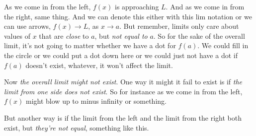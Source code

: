 \documentclass[pdftex, brazil, 12pt, twoside]{article}
\begin{document}
As we come in from the left, $f(x)$ is approaching $L$.
And as we come in from the right, same thing.
And we can denote this either with this lim notation
or we can use arrows, $f(x) \to L$, as $x \to a$.
But remember, limits only care about values
of $x$ that are \emph{close} to $a$, but \emph{not equal to} $a$.
So for the sake of the overall limit,
it's not going to matter whether we have a dot for $f(a)$.
We could fill in the circle or we could put a dot down here
or we could just not have a dot if $f(a)$ doesn't exist,
whatever, it won't affect the limit.

Now \emph{the overall limit might not exist}.
One way it might it fail to exist
is if \emph{the limit from one side does not exist}.
So for instance as we come in from the left, $f(x)$
might blow up to minus infinity or something.

\begin{figure}[H]
  \begin{center}
  \end{center}
\end{figure}

But another way is if the limit from the left and the limit
from the right both exist, but \emph{they're not equal},
something like this.

\begin{figure}[H]
  \begin{center}
  \end{center}
\end{figure}
\end{document}
